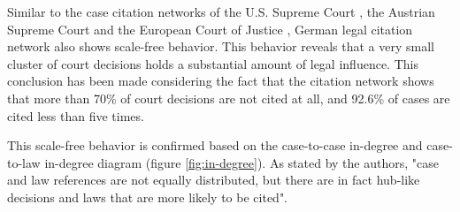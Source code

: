 \documentclass[runningheads]{llncs}
\begin{document}
Similar to the case citation networks of the U.S. Supreme Court \cite{Smith2005TheLaw}, the Austrian Supreme Court \cite{Geist2009UsingJurisdictions} and the European Court of Justice \cite{StaffanMalmgren2011TowardsLaw}, German legal citation network also shows scale-free behavior. This behavior reveals that a very small cluster of court decisions holds a substantial amount of legal influence. This conclusion has been made considering the fact that the citation network shows that more than 70\% of court decisions are not cited at all, and 92.6\% of cases are cited less than five times.

This scale-free behavior is confirmed based on the case-to-case in-degree and case-to-law in-degree diagram (figure \ref{fig:in-degree}). As stated by the authors, "case and law references are not equally distributed, but there are in fact hub-like decisions and laws that are more likely to be cited".
\end{document}
